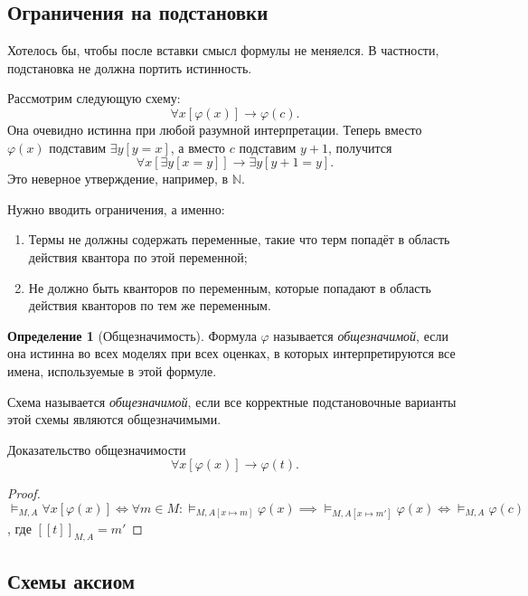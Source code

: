 \documentclass[12pt]{article}
\let\im\rightarrow
\def\NN{\mathbb{N}}
\theoremstyle{definition}
\newtheorem{definition}{Определение}[section]
\theoremstyle{plain}
\theoremstyle{remark}
\begin{document}
\subsection{Ограничения на подстановки}

Хотелось бы, чтобы после вставки смысл формулы не меняелся. В
частности, подстановка не должна портить истинность.

Рассмотрим следующую схему:
\[
  \forall x [\varphi(x)] \im \varphi(c).
\]
Она очевидно истинна при любой разумной интерпретации. Теперь вместо
$\varphi(x)$ подставим $\exists y [y = x]$, а вместо $c$ подставим $y
+ 1$, получится
\[
  \forall x [\exists y [x = y]] \im \exists y [y + 1 = y].
\]
Это неверное утверждение, например, в $\NN$.

Нужно вводить ограничения, а именно:
\begin{enumerate}
  \item Термы не должны содержать переменные, такие что терм попадёт
    в область действия квантора по этой переменной;

  \item Не должно быть кванторов по переменным, которые попадают в
    область действия кванторов по тем же переменным.
\end{enumerate}

\begin{definition}[Общезначимость]
  Формула $\varphi$ называется \textit{общезначимой}, если она
  истинна во всех моделях при всех оценках, в которых
  интерпретируются все имена, используемые в этой формуле.

  Схема называется \textit{общезначимой}, если все корректные
  подстановочные варианты этой схемы являются общезначимыми.
\end{definition}

Доказательство общезначимости
\[
  \forall x [\varphi(x)] \im \varphi(t).
\]
\begin{proof}
  $\models_{M, A} \forall x [\varphi(x)] \iff \forall m \in M \colon
  \models_{M, A[x \mapsto m]} \varphi(x) \implies \models_{M, A[x
  \mapsto m']} \varphi(x) \iff \models_{M,A} \varphi(c)$, где $[[t]]_{M,A} = m'$
\end{proof}

\subsection{Схемы аксиом}
\end{document}
